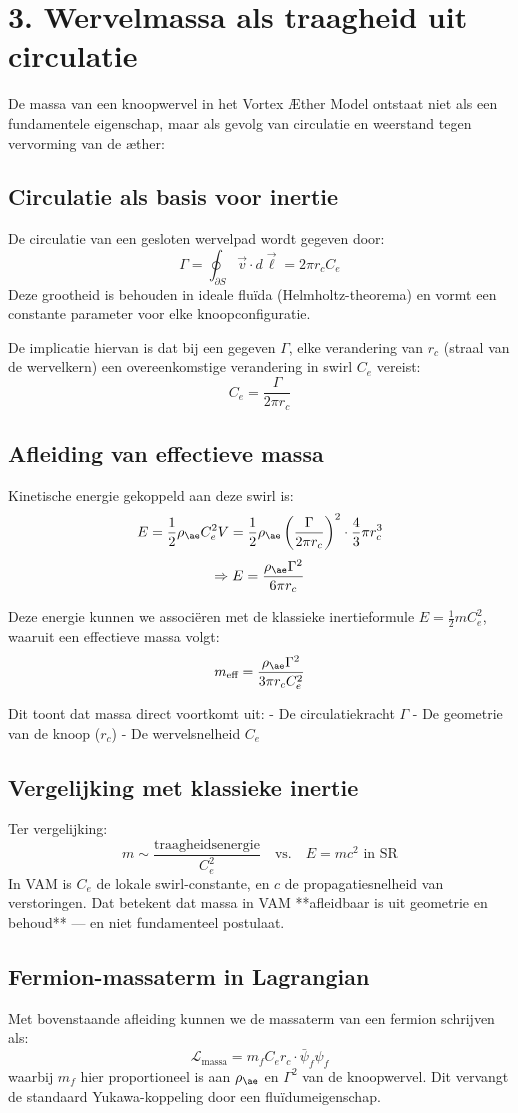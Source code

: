 \section*{3. Wervelmassa als traagheid uit circulatie}

De massa van een knoopwervel in het Vortex Æther Model ontstaat niet als een fundamentele eigenschap, maar als gevolg van circulatie en weerstand tegen vervorming van de æther:

\subsection*{Circulatie als basis voor inertie}
De circulatie van een gesloten wervelpad wordt gegeven door:
\[
    \Gamma = \oint_{\partial S} \vec{v} \cdot d\vec{\ell} = 2\pi r_c C_e
\]
Deze grootheid is behouden in ideale fluïda (Helmholtz-theorema) en vormt een constante parameter voor elke knoopconfiguratie.

De implicatie hiervan is dat bij een gegeven $\Gamma$, elke verandering van $r_c$ (straal van de wervelkern) een overeenkomstige verandering in swirl $C_e$ vereist:
\[
    C_e = \frac{\Gamma}{2\pi r_c}
\]

\subsection*{Afleiding van effectieve massa}
Kinetische energie gekoppeld aan deze swirl is:
\[
    E = \frac{1}{2} \rho_{\ae} C_e^2 V = \frac{1}{2} \rho_{\ae} \left( \frac{\Gamma}{2\pi r_c} \right)^2 \cdot \frac{4}{3}\pi r_c^3
\]
\[
    \Rightarrow E = \frac{\rho_{\ae} \Gamma^2}{6\pi r_c}
\]

Deze energie kunnen we associëren met de klassieke inertieformule $E = \frac{1}{2} m C_e^2$, waaruit een effectieve massa volgt:
\[
    m_{\text{eff}} = \frac{\rho_{\ae} \Gamma^2}{3\pi r_c C_e^2}
\]

Dit toont dat massa direct voortkomt uit:
- De circulatiekracht $\Gamma$
- De geometrie van de knoop ($r_c$)
- De wervelsnelheid $C_e$

\subsection*{Vergelijking met klassieke inertie}
Ter vergelijking:
\[
    m \sim \frac{\text{traagheidsenergie}}{C_e^2} \quad \text{vs.} \quad E = m c^2 \text{ in SR}
\]
In VAM is $C_e$ de lokale swirl-constante, en $c$ de propagatiesnelheid van verstoringen. Dat betekent dat massa in VAM **afleidbaar is uit geometrie en behoud** — en niet fundamenteel postulaat.

\subsection*{Fermion-massaterm in Lagrangian}
Met bovenstaande afleiding kunnen we de massaterm van een fermion schrijven als:
\[
    \mathcal{L}_{\text{massa}} = m_f C_e r_c \cdot \bar{\psi}_f \psi_f
\]
waarbij $m_f$ hier proportioneel is aan $\rho_{\ae}$ en $\Gamma^2$ van de knoopwervel. Dit vervangt de standaard Yukawa-koppeling door een fluïdumeigenschap.